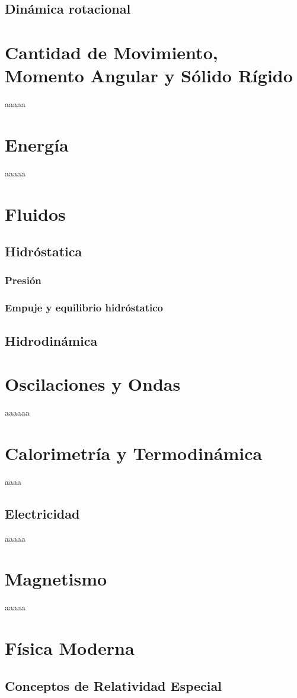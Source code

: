  \section{Din\'amica rotacional}
\chapter{Cantidad de Movimiento, Momento Angular y S\'olido Rígido}
aaaaa
\chapter{Energ\'ia}
aaaaa
\chapter{Fluidos}
 \section{Hidr\'ostatica}
  \subsection{Presi\'on}
  \subsection{Empuje y equilibrio hidr\'ostatico}
 \section{Hidrodin\'amica}
\chapter{Oscilaciones y Ondas}
aaaaaa
\chapter{Calorimetr\'ia y Termodinámica}
aaaa
\section{Electricidad}
aaaaa
\chapter{Magnetismo}
aaaaa
\chapter{F\'isica Moderna}
 \section{Conceptos de Relatividad Especial}
